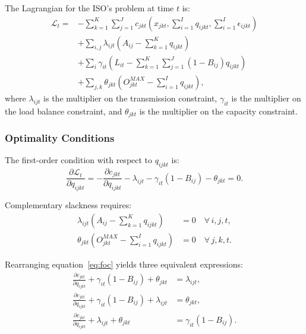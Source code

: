 \documentclass[12pt]{article}
\begin{document}
The Lagrangian for the ISO's problem at time $t$ is:
\begin{align}\label{eq:lagrangian}
    \mathcal{L}_t = & -\sum_{k=1}^{K} \sum_{j=1}^{J} c_{jkt}\left(x_{jkt}, \sum_{i=1}^{I} q_{ijkt}, \sum_{i=1}^{I} \epsilon_{ijkt}\right) \nonumber \\
    & + \sum_{i,j} \lambda_{ijt} \left(A_{ij} - \sum_{k=1}^{K} q_{ijkt}\right) \nonumber \\
    & + \sum_{i} \gamma_{it} \left(L_{it} - \sum_{k=1}^{K} \sum_{j=1}^{J} (1 - B_{ij}) q_{ijkt}\right) \nonumber \\
    & + \sum_{j,k} \theta_{jkt} \left(O_{jkt}^{MAX} - \sum_{i=1}^{I} q_{ijkt}\right),
\end{align}
where $\lambda_{ijt}$ is the multiplier on the transmission constraint, $\gamma_{it}$ is the multiplier on the load balance constraint, and $\theta_{jkt}$ is the multiplier on the capacity constraint.

\subsubsection{Optimality Conditions}

The first-order condition with respect to $q_{ijkt}$ is:
\begin{equation}\label{eq:foc}
    \frac{\partial \mathcal{L}_t}{\partial q_{ijkt}} = -\frac{\partial c_{jkt}}{\partial q_{ijkt}} - \lambda_{ijt} - \gamma_{it}(1 - B_{ij}) - \theta_{jkt} = 0.
\end{equation}

Complementary slackness requires:
\begin{align}
    \lambda_{ijt} \left(A_{ij} - \sum_{k=1}^{K} q_{ijkt}\right) &= 0 \quad \forall \, i, j, t, \label{eq:cs_trans} \\
    \theta_{jkt} \left(O_{jkt}^{MAX} - \sum_{i=1}^{I} q_{ijkt}\right) &= 0 \quad \forall \, j, k, t. \label{eq:cs_cap}
\end{align}

Rearranging equation~\eqref{eq:foc} yields three equivalent expressions:
\begin{align}
    \frac{\partial c_{jkt}}{\partial q_{ijkt}} + \gamma_{it}(1 - B_{ij}) + \theta_{jkt} &= \lambda_{ijt}, \label{eq:foc_lambda} \\
    \frac{\partial c_{jkt}}{\partial q_{ijkt}} + \gamma_{it}(1 - B_{ij}) + \lambda_{ijt} &= \theta_{jkt}, \label{eq:foc_theta} \\
    \frac{\partial c_{jkt}}{\partial q_{ijkt}} + \lambda_{ijt} + \theta_{jkt} &= \gamma_{it}(1 - B_{ij}). \label{eq:foc_gamma}
\end{align}
\end{document}
